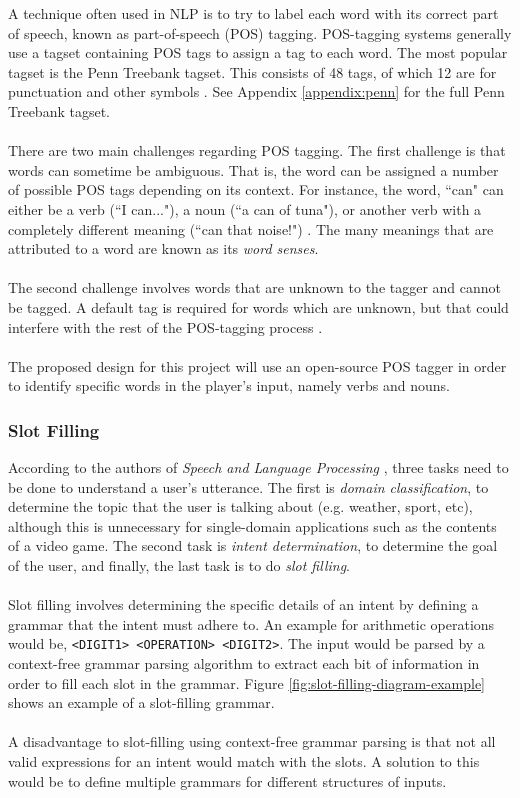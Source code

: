 \documentclass[11pt]{article}
\begin{document}
A technique often used in NLP is to try to label each word with its correct part of speech, known as part-of-speech (POS) tagging. POS-tagging systems generally use a tagset containing POS tags to assign a tag to each word. The most popular tagset is the Penn Treebank tagset. This consists of 48 tags, of which 12 are for punctuation and other symbols \cite{RefWorks:41}. See Appendix \ref{appendix:penn} for the full Penn Treebank tagset.
\\
\\
There are two main challenges regarding POS tagging. The first challenge is that words can sometime be ambiguous. That is, the word can be assigned a number of possible POS tags depending on its context. For instance, the word, ``can" can either be a verb (``I can..."), a noun (``a can of tuna"), or another verb with a completely different meaning (``can that noise!") \cite{RefWorks:43}. The many meanings that are attributed to a word are known as its \textit{word senses}.
\\
\\
The second challenge involves words that are unknown to the tagger and cannot be tagged. A default tag is required for words which are unknown, but that could interfere with the rest of the POS-tagging process \cite{RefWorks:41}.
\\
\\
The proposed design for this project will use an open-source POS tagger in order to identify specific words in the player's input, namely verbs and nouns.

\subsubsection{Slot Filling}

According to the authors of \textit{Speech and Language Processing} \cite{RefWorks:107}, three tasks need to be done to understand a user's utterance. The first is \textit{domain classification}, to determine the topic that the user is talking about (e.g. weather, sport, etc), although this is unnecessary for single-domain applications such as the contents of a video game. The second task is \textit{intent determination}, to determine the goal of the user, and finally, the last task is to do \textit{slot filling}.
\\
\\
Slot filling involves determining the specific details of an intent by defining a grammar that the intent must adhere to. An example for arithmetic operations would be, \texttt{<DIGIT1> <OPERATION> <DIGIT2>}. The input would be parsed by a context-free grammar parsing algorithm to extract each bit of information in order to fill each slot in the grammar. Figure \ref{fig:slot-filling-diagram-example} shows an example of a slot-filling grammar.
\\
\\
A disadvantage to slot-filling using context-free grammar parsing is that not all valid expressions for an intent would match with the slots. A solution to this would be to define multiple grammars for different structures of inputs.
\end{document}
